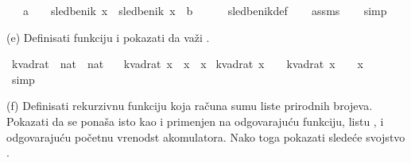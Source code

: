 \begin{isabellebody}
\begin{exercise}[subtitle=Primer jednostavne teorije]
\ \ \ {\isachardoublequoteopen}a\ {\isacharplus}{\kern0pt}\ {}\ {\isacharless}{\kern0pt}\ sledbenik\ x\ {\isasymand}\ sledbenik\ x\ {\isacharless}{\kern0pt}\ b\ {\isacharplus}{\kern0pt}\ {}{\isachardoublequoteclose}\isanewline
%
\isadelimproof
\ \ %
\endisadelimproof
%
\isatagproof
{}\isamarkupfalse%
\ sledbenik{\isacharunderscore}{\kern0pt}def\isanewline
\ \ \isamarkupfalse%
\ assms\isanewline
\ \ \isamarkupfalse%
\ simp%
\endisatagproof
{\isafoldproof}%
%
\isadelimproof
%
\endisadelimproof
%
\begin{isamarkuptext}%
(e) Definisati funkciju  i
          pokazati da važi .%
\end{isamarkuptext}\isamarkuptrue%
\isamarkupfalse%
\ kvadrat\ {\isacharcolon}{\kern0pt}{\isacharcolon}{\kern0pt}\ {\isachardoublequoteopen}nat\ {\isasymRightarrow}\ nat{\isachardoublequoteclose}\ \isanewline
\ \ {\isachardoublequoteopen}kvadrat\ x\ {\isasymequiv}\ x\ {\isacharasterisk}{\kern0pt}\ x{\isachardoublequoteclose}\isanewline
\isanewline
{}\isamarkupfalse%
\ {\isachardoublequoteopen}kvadrat\ {\isacharparenleft}{\kern0pt}x\ {\isacharplus}{\kern0pt}\ {}{\isacharparenright}{\kern0pt}\ {\isacharequal}{\kern0pt}\ kvadrat\ x\ {\isacharplus}{\kern0pt}\ {}\ {\isacharasterisk}{\kern0pt}\ x\ {\isacharplus}{\kern0pt}\ {}{\isachardoublequoteclose}\isanewline
%
\isadelimproof
\ \ %
\endisadelimproof
%
\isatagproof
{}\isamarkupfalse%
\ simp%
\endisatagproof
{\isafoldproof}%
%
\isadelimproof
%
\endisadelimproof
%
\begin{isamarkuptext}%
(f) Definisati rekurzivnu funkciju  koja računa sumu 
          liste prirodnih brojeva. Pokazati da se  ponaša isto kao 
          i  primenjen na odgovarajuću funkciju, listu , i 
          odgovarajuću početnu vrenodst akomulatora. Nako toga pokazati sledeće svojstvo 
          .%

\end{isamarkuptext}
\end{exercise}
\end{isabellebody}
